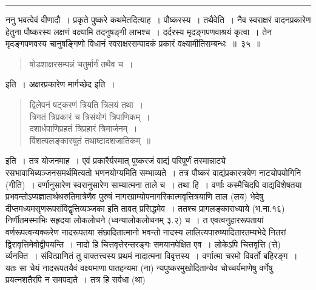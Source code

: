 \documentclass[11pt, openany]{book}
\begin{document}
\hrule

\vspace{2mm}
ननु भवत्वेवं वीणादौ~। प्रकृते पुष्करे कथमेतदित्याह~। {\qtt पौष्करस्य~। तथैवेति~।} नैव स्वराक्षरं वादनप्रकारेण हेतुना पौष्करस्य लक्षणं वक्ष्यामि तदनुषङ्गी लाभश्च~। {\qtt दर्दरस्य मृदङ्गपणवाश्रयं} कृत्वा~। तेन मृदङ्गपणवस्य चानुषङ्गिणो {\qtt विधानं} स्वराक्षरसम्पादकं प्रकारं वक्ष्यामीतिसम्बन्धः~॥~३५~॥

\begin{quote}
{\qt षोडशाक्षरसम्पन्नं चतुर्मार्गं तथैव च~।}
\end{quote}

\noindent
इति~। अक्षरप्रकारेण मार्गच्छेद इति~। 

\begin{quote}
{\qt द्विलेपनं षट्करणं त्रियति त्रिलयं तथा~।\\
 त्रिगतं त्रिप्रकारं च त्रिसंयोगं त्रिपाणिकम्~।\\
 दशार्धपाणिप्रहतं त्रिप्रहारं त्रिमार्जनम्~।\\
 विंशत्यलङ्कारयुतं तथाष्टादशजातिकम्~॥}
\end{quote}

\noindent
इति~। तत्र योजनमाह~। एवं प्रकारैर्यस्मात् पुष्करजं वाद्यं परिपूर्णं तस्मान्नाट्ये रसभावाभिब्यञ्जनसमर्थमित्यतो भणनयोग्यमिति सम्भाव्यते~। तत्र पौष्करं वाद्यंप्रकारत्रयेण नाट्योपयोगिनि (गीति)~। वर्णानुसारेण स्वरानुसारेण साम्यात्मना ताले च~। तथा हि~। वर्णाः कस्मैचिदपि वाद्यविशेषतया प्रभवन्तोऽप्यज्ञातार्थथरुतिमात्रेणैव पुरुषं नागरग्राम्योपनागरिकात्मवृत्तित्रयाणि ताल (लय) भेदेषु दीप्तमध्यमसृणरूपसंविद्वृत्तिव्यञ्जका इति तावत् प्रसिद्धमेव~। ततश्च प्रागलङ्काराध्याये  (भ.ना.१६) निर्णीतमस्माभिः सहृदया लोकलोचने  (ध्वन्यालोकलोचनम् ३.२) च~। त एवत्वनुहाररूपतायां वर्णरूपत्वन्यक्करेण नादरूपतया संछादितात्मानो भवन्तो नादस्य लालित्यपारुष्यादितारतम्यभेदे नितरां द्विरावृत्तिमेवोद्वीपयन्ति~। नादो हि चित्तवृत्तेरन्तरङ्गः समयानपेक्षित एव~। लोकेऽपि चित्तवृत्ति (त्ते) र्व्यनक्ति~। संवित्प्राणितं तु वाक्तत्त्वस्य प्रथमं नादात्मना  विवृत्तस्य~। वर्णात्मा चरमो विवर्तो बहिरङ्ग~। यतः सा चेयं नादरूपतयैवं वक्ष्यमाणा पातहन्यमा (ना) न्यपुष्करमुखोदितान्येव चोच्चर्यमाणेषु वर्णेषु प्रयत्नशतैरपि न समपद्यते~। तत्र हि सर्वधा (था)

\newpage
\end{document}
